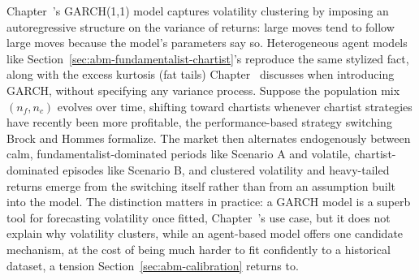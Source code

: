 \documentclass[../ai_in_finance]{subfiles}
\begin{document}
Chapter~'s GARCH(1,1) model captures volatility clustering by imposing an autoregressive structure on the variance of returns: large moves tend to follow large moves because the model's parameters say so. Heterogeneous agent models like Section~\ref{sec:abm-fundamentalist-chartist}'s reproduce the same stylized fact, along with the excess kurtosis (fat tails) Chapter~ discusses when introducing GARCH, without specifying any variance process. Suppose the population mix $(n_f, n_c)$ evolves over time, shifting toward chartists whenever chartist strategies have recently been more profitable, the performance-based strategy switching Brock and Hommes formalize. The market then alternates endogenously between calm, fundamentalist-dominated periods like Scenario A and volatile, chartist-dominated episodes like Scenario B, and clustered volatility and heavy-tailed returns emerge from the switching itself rather than from an assumption built into the model. The distinction matters in practice: a GARCH model is a superb tool for forecasting volatility once fitted, Chapter~'s use case, but it does not explain why volatility clusters, while an agent-based model offers one candidate mechanism, at the cost of being much harder to fit confidently to a historical dataset, a tension Section~\ref{sec:abm-calibration} returns to.

\end{document}

